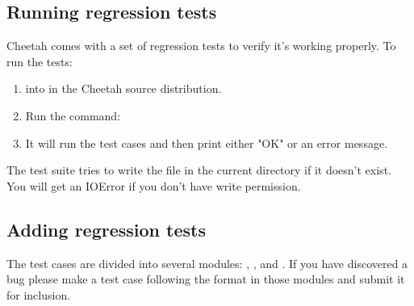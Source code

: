\subsection{Running regression tests}

Cheetah comes with a set of regression tests to verify it's working properly.
To run the tests:

\begin{enumerate}
     
\item {} into  in the Cheetah source distribution.
     
\item Run the command: 
     
\item It will run the test cases and then print either "OK" or an error message.

\end{enumerate}

The test suite tries to write the file  in the current
directory if it doesn't exist.  You will get an IOError if you don't have write
permission.

\subsection{Adding regression tests}

The test cases are divided into several modules:
, , and
. If you have discovered a bug please make a test
case following the format in those modules and submit it for inclusion.

